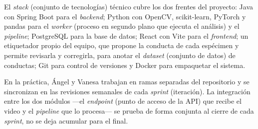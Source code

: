 El \textit{stack} (conjunto de tecnologías) técnico cubre los dos frentes del proyecto: Java con Spring Boot
para el \textit{backend}; Python con OpenCV, scikit-learn, PyTorch y pandas para el \textit{worker} (proceso en segundo plano que ejecuta el análisis) y el
\textit{pipeline}; PostgreSQL para la base de datos; React con Vite para el \textit{frontend}; un etiquetador propio del equipo, que propone la conducta de cada
espécimen y permite revisarla y corregirla, para anotar el \textit{dataset} (conjunto de datos) de conductas; Git
para control de versiones y Docker para empaquetar el sistema.

En la práctica, Ángel y Vanesa trabajan en ramas separadas del repositorio y se
sincronizan en las revisiones semanales de cada \textit{sprint} (iteración). La integración entre los dos módulos
---el \textit{endpoint} (punto de acceso de la API) que recibe el video y el \textit{pipeline} que lo procesa--- se prueba de forma
conjunta al cierre de cada \textit{sprint}, no se deja acumular para el final.